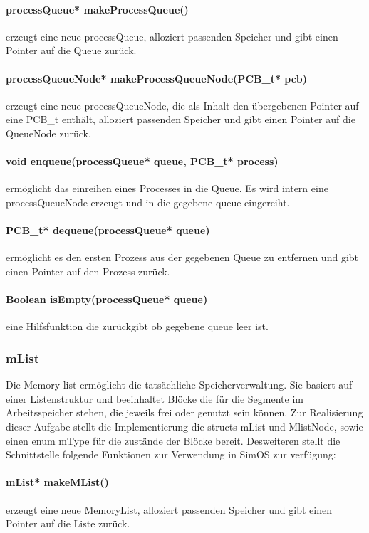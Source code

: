 \paragraph{processQueue* makeProcessQueue()} erzeugt eine neue processQueue, alloziert passenden Speicher und gibt einen Pointer auf die Queue zurück.

\paragraph{processQueueNode* makeProcessQueueNode(PCB\_t* pcb)} erzeugt eine neue processQueueNode, die als Inhalt den übergebenen Pointer auf eine PCB\_t enthält, alloziert passenden Speicher und gibt einen Pointer auf die QueueNode zurück.

\paragraph{void enqueue(processQueue* queue, PCB\_t* process)} ermöglicht das einreihen eines Processes in die Queue. Es wird intern eine processQueueNode erzeugt und in die gegebene queue eingereiht.

\paragraph{PCB\_t* dequeue(processQueue* queue)} ermöglicht es den ersten Prozess aus der gegebenen Queue zu entfernen und gibt einen Pointer auf den Prozess zurück.

\paragraph{Boolean isEmpty(processQueue* queue)} eine Hilfsfunktion die zurückgibt ob gegebene queue leer ist.


\subsubsection{mList}
Die Memory list ermöglicht die tatsächliche Speicherverwaltung. Sie basiert auf einer Listenstruktur und beeinhaltet Blöcke die für die Segmente im Arbeitsspeicher stehen, die jeweils frei oder genutzt sein können.
Zur Realisierung dieser Aufgabe stellt die Implementierung die structs mList und MlistNode, sowie einen enum mType für die zustände der Blöcke bereit.
Desweiteren stellt die Schnittstelle folgende Funktionen zur Verwendung in SimOS zur verfügung:

\paragraph{mList* makeMList()} erzeugt eine neue MemoryList, alloziert passenden Speicher und gibt einen Pointer auf die Liste zurück.

